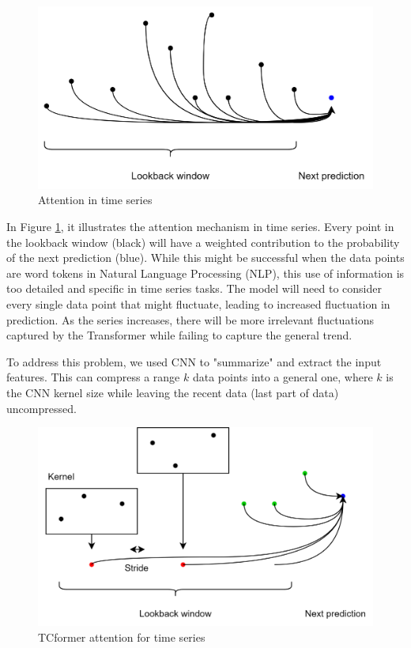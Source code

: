 \documentclass[stu,12pt,floatsintext]{apa7}
\begin{document}
\begin{figure}[H]
    \centering
    \includegraphics[width=0.8\linewidth]{images/AttentionInTimeSeries.drawio.png}
    \caption{Attention in time series}
    \label{fig:attention-time-series}
\end{figure}

In Figure \ref{fig:attention-time-series}, it illustrates the attention mechanism in time series. Every point in the lookback window (black) will have a weighted contribution to the probability of the next prediction (blue). While this might be successful when the data points are word tokens in Natural Language Processing (NLP), this use of information is too detailed and specific in time series tasks. The model will need to consider every single data point that might fluctuate, leading to increased fluctuation in prediction. As the series increases, there will be more irrelevant fluctuations captured by the Transformer while failing to capture the general trend.  

To address this problem, we used CNN to "summarize" and extract the input features. This can compress a range $k$ data points into a general one, where $k$ is the CNN kernel size while leaving the recent data (last part of data) uncompressed. 

\begin{figure}[H]
    \centering
    \includegraphics[width=0.8\linewidth]{images/AttentionInTCformer.drawio.png}
    \caption{TCformer attention for time series}
    \label{fig:attention-tcformer}
\end{figure}
\end{document}
